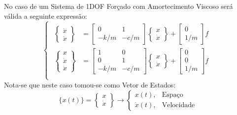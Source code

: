 \documentclass{article}
\begin{document}
\begin{resolution}
\begin{enumerate}
\begin{enumerate}[noitemsep]
        \end{enumerate}
    \end{enumerate}
    No caso de um Sistema de 1DOF Forçado com Amortecimento Viscoso será válida a seguinte expressão:
    \begin{equation}
    \begin{cases}
    \begin{aligned}
        \begin{Bmatrix} \dot{x}\\ \ddot{x} \end{Bmatrix} &=
        \begin{bmatrix} 0 & 1\\ -k/m & -c/m\end{bmatrix}\begin{Bmatrix} x\\ \dot{x} \end{Bmatrix} + 
        \begin{bmatrix} 0\\ 1/m \end{bmatrix} f\\
        \begin{Bmatrix} x\\ \dot{x}\\ \ddot{x} \end{Bmatrix} &=
        \begin{bmatrix} 1 & 0\\ 0 & 1\\ -k/m & -c/m\end{bmatrix}\begin{Bmatrix} x\\ \dot{x} \end{Bmatrix} + 
        \begin{bmatrix} 0\\ 0\\ 1/m \end{bmatrix} f\\
    \end{aligned}
    \end{cases}
    \end{equation}
    Nota-se que neste caso tomou-se como Vetor de Estados:
    \begin{equation*}
        \lbrace x(t) \rbrace = \begin{Bmatrix} x\\ \dot{x} \end{Bmatrix} 
        \to \begin{cases} x(t), &\text{Espaço}\\ \dot{x}(t),&\text{Velocidade} \end{cases}

\end{equation*}
\end{resolution}
\end{document}
